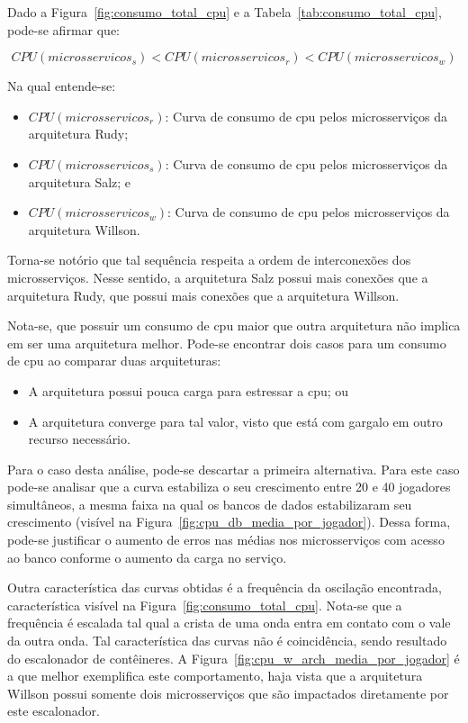 Dado a Figura~\ref{fig:consumo_total_cpu} e a Tabela~\ref{tab:consumo_total_cpu}, pode-se afirmar que:

$$
    CPU(microsservicos_{s}) < CPU(microsservicos_{r}) < CPU(microsservicos_{w})
$$

Na qual entende-se:

\begin{itemize}
\item $CPU(microsservicos_{r})$: Curva de consumo de \ac{cpu} pelos microsserviços da arquitetura Rudy;
\item $CPU(microsservicos_{s})$: Curva de consumo de \ac{cpu} pelos microsserviços da arquitetura Salz; e
\item $CPU(microsservicos_{w})$: Curva de consumo de \ac{cpu} pelos microsserviços da arquitetura Willson.
\end{itemize}

Torna-se notório que tal sequência respeita a ordem de interconexões dos microsserviços.
%
Nesse sentido, a arquitetura Salz possui mais conexões que a arquitetura Rudy, que possui mais conexões que a arquitetura Willson.

Nota-se, que possuir um consumo de \ac{cpu} maior que outra arquitetura não implica em ser uma arquitetura melhor.
%
Pode-se encontrar dois casos para um consumo de \ac{cpu} ao comparar duas arquiteturas:

\begin{itemize}
 \item A arquitetura possui pouca carga para estressar a \ac{cpu}; ou
 \item A arquitetura converge para tal valor, visto que está com gargalo em outro recurso necessário.
\end{itemize}

Para o caso desta análise, pode-se descartar a primeira alternativa.
%
Para este caso pode-se analisar que a curva estabiliza o seu crescimento entre 20 e 40 jogadores simultâneos, a mesma faixa na qual os bancos de dados estabilizaram seu crescimento (visível na Figura~\ref{fig:cpu_db_media_por_jogador}).
%
Dessa forma, pode-se justificar o aumento de erros nas médias nos microsserviços com acesso ao banco conforme o aumento da carga no serviço.

Outra característica das curvas obtidas é a frequência da oscilação encontrada, característica visível na Figura~\ref{fig:consumo_total_cpu}.
%
Nota-se que a frequência é escalada tal qual a crista de uma onda entra em contato com o vale da outra onda.
%
Tal característica das curvas não é coincidência, sendo resultado do escalonador de contêineres.
%
A Figura~\ref{fig:cpu_w_arch_media_por_jogador} é a que melhor exemplifica este comportamento, haja vista que a arquitetura Willson possui somente dois microsserviços que são impactados diretamente por este escalonador.


